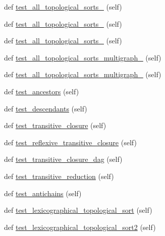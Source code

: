 \begin{DoxyCompactItemize}
def \hyperlink{classnetworkx_1_1algorithms_1_1tests_1_1test__dag_1_1TestDAG_a605cedba926ecbae0de2043c67d5cc55}{test\+\_\+all\+\_\+topological\+\_\+sorts\+\_} (self)
\item 
def \hyperlink{classnetworkx_1_1algorithms_1_1tests_1_1test__dag_1_1TestDAG_a81d597347c7c2f1e8fe7a8292e1d9059}{test\+\_\+all\+\_\+topological\+\_\+sorts\+\_} (self)
\item 
def \hyperlink{classnetworkx_1_1algorithms_1_1tests_1_1test__dag_1_1TestDAG_a5680da2e582862d89617e47915c370e1}{test\+\_\+all\+\_\+topological\+\_\+sorts\+\_} (self)
\item 
def \hyperlink{classnetworkx_1_1algorithms_1_1tests_1_1test__dag_1_1TestDAG_a1bcb215935d0c9c5463e83d0cd566180}{test\+\_\+all\+\_\+topological\+\_\+sorts\+\_\+multigraph\+\_} (self)
\item 
def \hyperlink{classnetworkx_1_1algorithms_1_1tests_1_1test__dag_1_1TestDAG_a71ed608a8ba6c4ed4c34eaf12c1dcd97}{test\+\_\+all\+\_\+topological\+\_\+sorts\+\_\+multigraph\+\_} (self)
\item 
def \hyperlink{classnetworkx_1_1algorithms_1_1tests_1_1test__dag_1_1TestDAG_add4b9e712150d36b173e22eb2109130e}{test\+\_\+ancestors} (self)
\item 
def \hyperlink{classnetworkx_1_1algorithms_1_1tests_1_1test__dag_1_1TestDAG_a0d99468f0db83feaba8996b1a04417d1}{test\+\_\+descendants} (self)
\item 
def \hyperlink{classnetworkx_1_1algorithms_1_1tests_1_1test__dag_1_1TestDAG_a333da9e382040b99125713fd82473094}{test\+\_\+transitive\+\_\+closure} (self)
\item 
def \hyperlink{classnetworkx_1_1algorithms_1_1tests_1_1test__dag_1_1TestDAG_aef98e8fa54a9166eb61495e0cd139a52}{test\+\_\+reflexive\+\_\+transitive\+\_\+closure} (self)
\item 
def \hyperlink{classnetworkx_1_1algorithms_1_1tests_1_1test__dag_1_1TestDAG_a93784a27cf10abbb32a560b9d240d442}{test\+\_\+transitive\+\_\+closure\+\_\+dag} (self)
\item 
def \hyperlink{classnetworkx_1_1algorithms_1_1tests_1_1test__dag_1_1TestDAG_adfb6e614a4f158f77709bc8a3654b7d6}{test\+\_\+transitive\+\_\+reduction} (self)
\item 
def \hyperlink{classnetworkx_1_1algorithms_1_1tests_1_1test__dag_1_1TestDAG_a96f0bab1cdf650de31facdf131a8e656}{test\+\_\+antichains} (self)
\item 
def \hyperlink{classnetworkx_1_1algorithms_1_1tests_1_1test__dag_1_1TestDAG_a68f6c70f74e5cba968643609dc911adf}{test\+\_\+lexicographical\+\_\+topological\+\_\+sort} (self)
\item 
def \hyperlink{classnetworkx_1_1algorithms_1_1tests_1_1test__dag_1_1TestDAG_a578a55b8707e5981c926b89811790394}{test\+\_\+lexicographical\+\_\+topological\+\_\+sort2} (self)
\end{DoxyCompactItemize}
